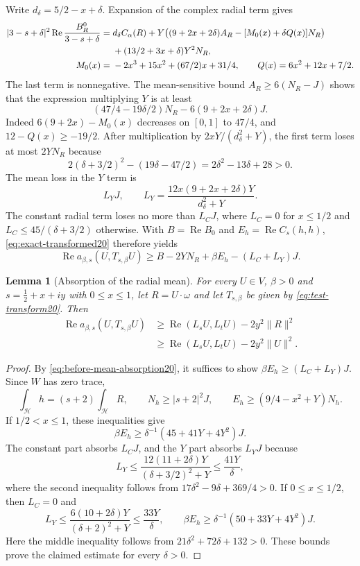 \documentclass[11pt,a4paper]{article}
\newtheorem{lemma}[theorem]{Lemma}
\theoremstyle{remark}
\numberwithin{equation}{section}
\begin{document}
Write $d_\delta=5/2-x+\delta$. Expansion of the complex radial term gives
\begin{align}
 |3-s+\delta|^2\operatorname{Re}\frac{B_R^0}{3-s+\delta}
 ={}&d_\delta C_\alpha(R)
 +Y\bigl((9+2x+2\delta)A_R-[M_0(x)+\delta Q(x)]N_R\bigr)
 \notag\\
 &+(13/2+3x+\delta)Y^2N_R,\label{eq:radial-complex20}\\
 M_0(x)={}&-2x^3+15x^2+(67/2)x+31/4,
 \qquad Q(x)=6x^2+12x+7/2.\notag
\end{align}
The last term is nonnegative. The mean-sensitive bound
$A_R\ge6(N_R-J)$ shows that the expression multiplying $Y$ is at least
\[
 (47/4-19\delta/2)N_R-6(9+2x+2\delta)J.
\]
Indeed $6(9+2x)-M_0(x)$ decreases on $[0,1]$ to $47/4$, and
$12-Q(x)\ge-19/2$. After multiplication by
$2xY/(d_\delta^2+Y)$, the first term loses at most $2YN_R$ because
\[
 2(\delta+3/2)^2-(19\delta-47/2)
 =2\delta^2-13\delta+28>0.
\]
The mean loss in the $Y$ term is
\[
 L_YJ,\qquad L_Y=\frac{12x(9+2x+2\delta)Y}{d_\delta^2+Y}.
\]
The constant radial term loses no more than $L_CJ$, where
$L_C=0$ for $x\le1/2$ and $L_C\le45/(\delta+3/2)$ otherwise.
With $B=\operatorname{Re}B_0$ and $E_h=\operatorname{Re}C_s(h,h)$,
\eqref{eq:exact-transformed20} therefore yields
\begin{equation}\label{eq:before-mean-absorption20}
 \operatorname{Re}a_{\beta,s}(U,T_{s,\beta}U)
 \ge B-2YN_R+\beta E_h-(L_C+L_Y)J.
\end{equation}

\begin{lemma}[Absorption of the radial mean]\label{lem:radial-mean-absorption22}
For every $U\in V$, $\beta>0$ and $s=\tfrac12+x+iy$ with $0\le x\le1$,
let $R=U\cdot\omega$ and let $T_{s,\beta}$ be given by
\eqref{eq:test-transform20}. Then
\begin{equation}\label{eq:after-mean-absorption20}
\begin{aligned}
 \operatorname{Re}a_{\beta,s}(U,T_{s,\beta}U)
 &\ge \operatorname{Re}(L_sU,L_tU)-2y^2\|R\|^2\\
 &\ge \operatorname{Re}(L_sU,L_tU)-2y^2\|U\|^2.
\end{aligned}
\end{equation}
\end{lemma}
\begin{proof}
By \eqref{eq:before-mean-absorption20}, it suffices to show
$\beta E_h\ge(L_C+L_Y)J$.
Since $W$ has zero trace,
\[
 \int_{\mathcal H}h=(s+2)\int_{\mathcal H}R,
 \qquad N_h\ge|s+2|^2J,
 \qquad E_h\ge(9/4-x^2+Y)N_h.
\]
If $1/2<x\le1$, these inequalities give
\[
 \beta E_h\ge\delta^{-1}(45+41Y+4Y^2)J.
\]
The constant part absorbs $L_CJ$, and the $Y$ part absorbs $L_YJ$ because
\[
 L_Y\le\frac{12(11+2\delta)Y}{(\delta+3/2)^2+Y}
 \le\frac{41Y}{\delta},
\]
where the second inequality follows from
$17\delta^2-9\delta+369/4>0$.
If $0\le x\le1/2$, then $L_C=0$ and
\[
 L_Y\le\frac{6(10+2\delta)Y}{(\delta+2)^2+Y}
 \le\frac{33Y}{\delta},\qquad
 \beta E_h\ge\delta^{-1}(50+33Y+4Y^2)J.
\]
Here the middle inequality follows from
$21\delta^2+72\delta+132>0$. These bounds prove the claimed estimate
for every $\delta>0$.
\end{proof}
\end{document}

